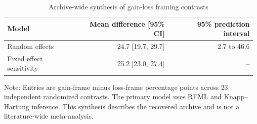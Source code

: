 \begin{table}[H]
\centering
\caption{\label{tab:archive-meta}Archive-wide synthesis of gain-loss framing contrasts}
\centering
\begin{threeparttable}
\begin{tabular}[t]{lrr}
\toprule
Model & Mean difference [95\% CI] & 95\% prediction interval\\
\midrule
Random effects & 24.7 [19.7, 29.7] & 2.7 to 46.6\\
Fixed effect sensitivity & 25.2 [23.0, 27.4] & --\\
\bottomrule
\end{tabular}
\begin{tablenotes}[para]
\item Note: Entries are gain-frame minus loss-frame percentage points across 23 independent randomized contrasts. The primary model uses REML and Knapp--Hartung inference. This synthesis describes the recovered archive and is not a literature-wide meta-analysis.
\end{tablenotes}
\end{threeparttable}
\end{table}
